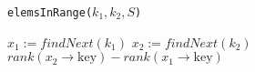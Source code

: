 \documentclass[../main.tex]{subfiles}
\begin{document}
\begin{algorithm}
\caption{\texttt{elemsInRange(\(k_{1}, k_{2}, S\))}}
\label{alg:ex2.elemsInRange}
\begin{algorithmic}
  \State \(x_{1} := findNext(k_{1})\)
  \State \(x_{2} := findNext(k_{2})\)
  \State \Return \(rank(x_{2} \rightarrow \text{key}) - rank(x_{1} \rightarrow \text{key})\)
\end{algorithmic}
\end{algorithm}

\end{document}
